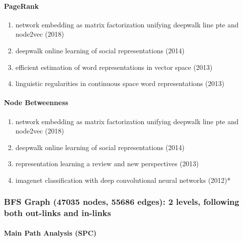 \documentclass[lettepaper,]{article}
\providecommand{\tightlist}{%
  \setlength{\itemsep}{0pt}\setlength{\parskip}{0pt}}
\let\oldparagraph\paragraph
\renewcommand{\paragraph}[1]{\oldparagraph{#1}\mbox{}}
\begin{document}
\hypertarget{pagerank-4}{%
\paragraph{PageRank}\label{pagerank-4}}

\begin{enumerate}
\def\labelenumi{\arabic{enumi}.}
\tightlist
\item
  network embedding as matrix factorization unifying deepwalk line pte
  and node2vec (2018)
\item
  deepwalk online learning of social representations (2014)
\item
  efficient estimation of word representations in vector space (2013)
\item
  linguistic regularities in continuous space word representations
  (2013)
\end{enumerate}

\hypertarget{node-betweenness-1}{%
\paragraph{Node Betweenness}\label{node-betweenness-1}}

\begin{enumerate}
\def\labelenumi{\arabic{enumi}.}
\tightlist
\item
  network embedding as matrix factorization unifying deepwalk line pte
  and node2vec (2018)
\item
  deepwalk online learning of social representations (2014)
\item
  representation learning a review and new perspectives (2013)
\item
  imagenet classification with deep convolutional neural networks
  (2012)*
\end{enumerate}

\hypertarget{bfs-graph-47035-nodes-55686-edges-2-levels-following-both-out-links-and-in-links}{%
\subsubsection{BFS Graph (47035 nodes, 55686 edges): 2 levels, following
both out-links and
in-links}\label{bfs-graph-47035-nodes-55686-edges-2-levels-following-both-out-links-and-in-links}}

\hypertarget{main-path-analysis-spc-2}{%
\paragraph{Main Path Analysis (SPC)}\label{main-path-analysis-spc-2}}
\end{document}
